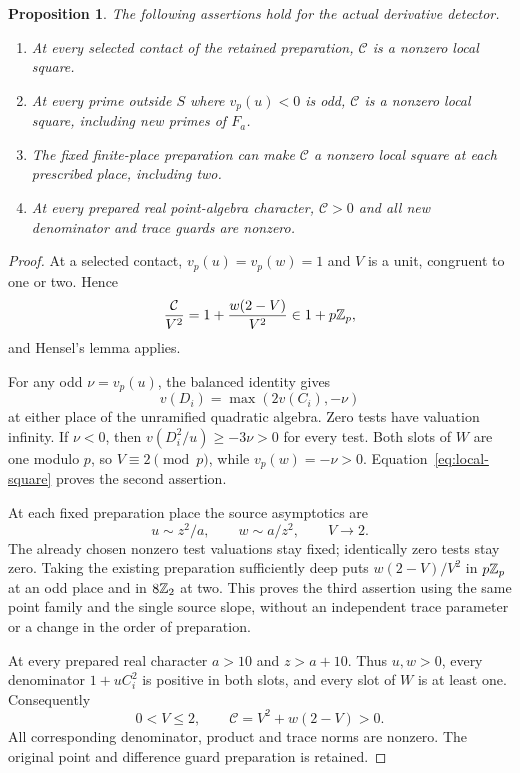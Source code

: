 \documentclass[11pt,a4paper]{article}
\newtheorem{proposition}[theorem]{Proposition}
\begin{document}
\begin{proposition}\label{prop:local}
The following assertions hold for the actual derivative detector.
\begin{enumerate}
\item At every selected contact of the retained preparation,
$\mathcal C$ is a nonzero local square.
\item At every prime outside $S$ where $v_p(u)<0$ is odd,
$\mathcal C$ is a nonzero local square, including new primes of
$F_a$.
\item The fixed finite-place preparation can make $\mathcal C$
a nonzero local square at each prescribed place, including two.
\item At every prepared real point-algebra character,
$\mathcal C>0$ and all new denominator and trace guards are nonzero.
\end{enumerate}
\end{proposition}
\begin{proof}
At a selected contact, $v_p(u)=v_p(w)=1$ and $V$ is a unit,
congruent to one or two. Hence
\begin{equation}\label{eq:local-square}
          \frac{\mathcal C}{V^2}
               =1+\frac{w(2-V)}{V^2}\in1+p\mathbb Z_p,
\end{equation}
and Hensel's lemma applies.

For any odd $\nu=v_p(u)$, the balanced identity gives
\[
                  v(D_i)=\max(2v(C_i),-\nu)
\]
at either place of the unramified quadratic algebra. Zero tests have
valuation infinity. If $\nu<0$, then
$v(D_i^2/u)\ge-3\nu>0$ for every test. Both slots of $W$ are
one modulo $p$, so $V\equiv2\pmod p$, while
$v_p(w)=-\nu>0$. Equation~\eqref{eq:local-square} proves the
second assertion.

At each fixed preparation place the source asymptotics are
\[
                      u\sim z^2/a,\qquad w\sim a/z^2,
                         \qquad V\longrightarrow2.
\]
The already chosen nonzero test valuations stay fixed; identically
zero tests stay zero. Taking the existing preparation sufficiently
deep puts $w(2-V)/V^2$ in $p\mathbb Z_p$ at an odd place and in
$8\mathbb Z_2$ at two. This proves the third assertion using the same point family and the single source
slope, without an independent trace parameter or a change in the
order of preparation.

At every prepared real character $a>10$ and $z>a+10$. Thus
$u,w>0$, every denominator $1+uC_i^2$ is positive in both slots,
and every slot of $W$ is at least one. Consequently
\begin{equation}\label{eq:positive}
                   0<V\le2,\qquad
                    \mathcal C=V^2+w(2-V)>0.
\end{equation}
All corresponding denominator, product and trace norms are nonzero.
The original point and difference guard preparation is retained.
\end{proof}
\end{document}
